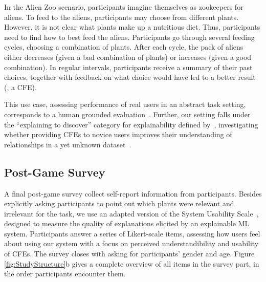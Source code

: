 In the Alien Zoo scenario, participants imagine themselves as zookeepers for aliens. 
To feed to the aliens, participants may choose from different plants. 
However, it is not clear what plants make up a nutritious diet. 
Thus, participants need to find how to best feed the aliens. 
Participants go through several feeding cycles, choosing a combination of plants. 
After each cycle, the pack of aliens either decreases (given a bad combination of plants) or increases (given a good combination). 
In regular intervals, participants receive a summary of their past choices, together with feedback on what choice would have led to a better result (\ie, a \gls{CFE}).


This use case, assessing performance of real users in an abstract task setting, corresponds to a human grounded evaluation~\citep{doshi-velez_towards_2017}.
Further, our setting falls under the ``explaining to discover'' category for explainability defined by~\citeauthor{adadi_peeking_2018}, investigating whether providing \glspl{CFE} to novice users improves their understanding of relationships in a yet unknown dataset~\citep{adadi_peeking_2018}.


\subsection{Post-Game Survey}

A final post-game survey collect self-report information from participants.
Besides explicitly asking participants to point out which plants were relevant and irrelevant for the task, we use an adapted version of the System Usability Scale~\citep{holzinger_measuring_2020}, designed to measure the quality of explanations elicited by an explainable \gls{ML} system.
Participants answer a series of Likert-scale items, assessing how users feel about using our system with a focus on perceived understandibility and usability of \glspl{CFE}.
The survey closes with asking for participants' gender and age.
Figure \ref{fig:StudyStructure}b gives a complete overview of all items in the survey part, in the order participants encounter them.


